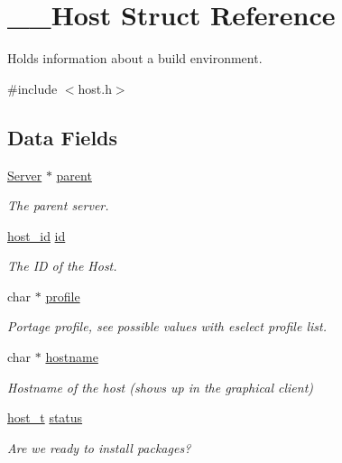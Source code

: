 \hypertarget{struct_____host}{}\section{\+\_\+\+\_\+\+Host Struct Reference}
\label{struct_____host}


Holds information about a build environment.  




{\ttfamily \#include $<$host.\+h$>$}

\subsection*{Data Fields}
\begin{DoxyCompactItemize}
\item 
\mbox{\hyperlink{server_8h_a705d964b8a67edeeb3943273a397e4c2}{Server}} $\ast$ \mbox{\hyperlink{struct_____host_ac050615c8d9d8da7d2cfaffaafd9473d}{parent}}
\begin{DoxyCompactList}\small\item\em The parent server. \end{DoxyCompactList}\item 
\mbox{\hyperlink{host_8h_ad9a5413d8b4376a70706368c97972c2b}{host\+\_\+id}} \mbox{\hyperlink{struct_____host_a2101a62a3859aa1106a2722c659f93c6}{id}}
\begin{DoxyCompactList}\small\item\em The ID of the Host. \end{DoxyCompactList}\item 
char $\ast$ \mbox{\hyperlink{struct_____host_abfbef38d66410fc8705ea35967e65115}{profile}}
\begin{DoxyCompactList}\small\item\em Portage profile, see possible values with eselect profile list. \end{DoxyCompactList}\item 
char $\ast$ \mbox{\hyperlink{struct_____host_a3fdd5a6a4e8dc35d72067996674c9ac5}{hostname}}
\begin{DoxyCompactList}\small\item\em Hostname of the host (shows up in the graphical client) \end{DoxyCompactList}\item 
\mbox{\hyperlink{host_8h_a1392734739c1e1eba62ebfab3bf7dc92}{host\+\_\+t}} \mbox{\hyperlink{struct_____host_a0a366a15966b166891ba8451009df63d}{status}}
\begin{DoxyCompactList}\small\item\em Are we ready to install packages? \end{DoxyCompactList}\item 

\end{DoxyCompactItemize}
